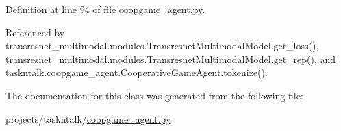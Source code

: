 Definition at line 94 of file coopgame\+\_\+agent.\+py.



Referenced by transresnet\+\_\+multimodal.\+modules.\+Transresnet\+Multimodal\+Model.\+get\+\_\+loss(), transresnet\+\_\+multimodal.\+modules.\+Transresnet\+Multimodal\+Model.\+get\+\_\+rep(), and taskntalk.\+coopgame\+\_\+agent.\+Cooperative\+Game\+Agent.\+tokenize().



The documentation for this class was generated from the following file\+:\begin{DoxyCompactItemize}
\item 
projects/taskntalk/\hyperlink{coopgame__agent_8py}{coopgame\+\_\+agent.\+py}\end{DoxyCompactItemize}
